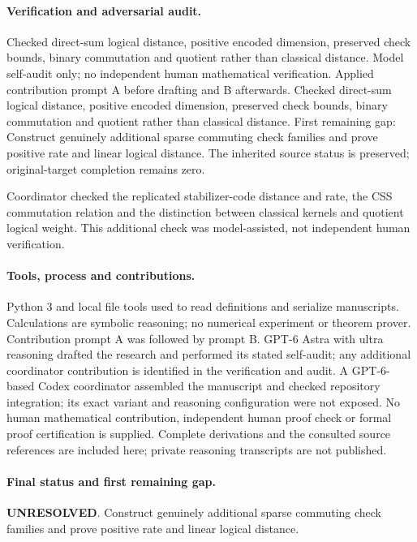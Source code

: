 \documentclass[11pt]{article}
\begin{document}
\paragraph{Verification and adversarial audit.}
Checked direct-sum logical distance, positive encoded dimension, preserved check bounds, binary commutation and quotient rather than classical distance. Model self-audit only; no independent human mathematical verification. Applied contribution prompt A before drafting and B afterwards. Checked direct-sum logical distance, positive encoded dimension, preserved check bounds, binary commutation and quotient rather than classical distance. First remaining gap: Construct genuinely additional sparse commuting check families and prove positive rate and linear logical distance. The inherited source status is preserved; original-target completion remains zero.

Coordinator checked the replicated stabilizer-code distance and rate, the CSS commutation relation and the distinction between classical kernels and quotient logical weight. This additional check was model-assisted, not independent human verification.

\paragraph{Tools, process and contributions.}
Python 3 and local file tools used to read definitions and serialize manuscripts. Calculations are symbolic reasoning; no numerical experiment or theorem prover. Contribution prompt A was followed by prompt B. GPT-6 Astra with ultra reasoning drafted the research and performed its stated self-audit; any additional coordinator contribution is identified in the verification and audit. A GPT-6-based Codex coordinator assembled the manuscript and checked repository integration; its exact variant and reasoning configuration were not exposed. No human mathematical contribution, independent human proof check or formal proof certification is supplied. Complete derivations and the consulted source references are included here; private reasoning transcripts are not published.

\paragraph{Final status and first remaining gap.}
\textbf{UNRESOLVED}. Construct genuinely additional sparse commuting check families and prove positive rate and linear logical distance.
\end{document}
